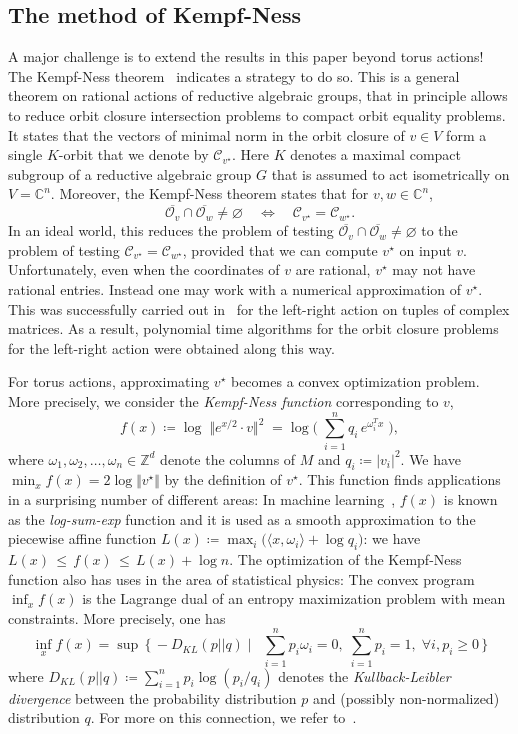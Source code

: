 \documentclass[10pt,a4paper]{article}
\theoremstyle{definition}
\newcommand{\CC}{\mathbb{C}}
\newcommand{\ZZ}{\mathbb{Z}}
\newcommand{\OO}{\ensuremath{\mathcal{O}}}
\newcommand{\KK}{\ensuremath{\mathcal{C}}}
\numberwithin{equation}{section}
\begin{document}
\subsection{The method of Kempf-Ness}
A major challenge is to extend the results in this paper beyond torus actions!
The Kempf-Ness theorem~\cite{kempfness} indicates a strategy to do so.
This is a general theorem on rational actions of reductive algebraic groups,
that in principle allows to reduce orbit closure intersection problems
to compact orbit equality problems.
It states that the vectors of minimal norm in the orbit closure of $v\in V$
form a single $K$-orbit that we denote by $\KK_{v^\star}$.
Here $K$ denotes a maximal compact subgroup of a reductive algebraic group $G$
that is assumed to act isometrically on $V=\CC^n$.
Moreover, the Kempf-Ness theorem states that for $v,w\in\CC^n$,
\[
 \overline{\OO_v}\cap\overline{\OO_w}\neq\varnothing \quad \iff\quad \KK_{v^\star}=\KK_{w^\star}.
\]
In an ideal world, this reduces the problem of testing
$\overline{\OO_v}\cap\overline{\OO_w}\neq\varnothing$
to the problem of testing $\KK_{v^\star}=\KK_{w^\star}$,
provided that we can compute $v^\star$ on input $v$.
Unfortunately, even when the coordinates of $v$ are rational,
$v^\star$ may not have rational entries.
Instead one may work with a numerical approximation of $v^\star$.
This was successfully carried out in~\cite{AZGLOW}
for the left-right action on tuples of complex matrices.
As a result, polynomial time algorithms for the orbit closure problems for the left-right action were obtained along this way.

For torus actions, approximating $v^\star$ becomes a convex optimization problem. More precisely, we consider the \emph{Kempf-Ness function} corresponding to $v$, \[
f(x) \coloneqq \log\; \Vert e^{x/2}\cdot v\Vert^2 \; = \log\Big(\;\sum_{i=1}^n q_i\, e^{\omega_i^T x}\;\Big),
\] where $\omega_1,\omega_2,\dots,\omega_n\in\ZZ^d$ denote the columns of $M$ and $q_i\coloneqq |v_i|^2$. We have $\min_x f(x)=2\log\Vert v^\star\Vert$ by the definition of $v^\star$. This function finds applications in a surprising number of different areas: In machine learning~\cite{ml-lse-1, ml-lse-2, ml-lse-3, ml-tropical},
$f(x)$ is known as the \textit{log-sum-exp} function and it is used as a smooth approximation
to the piecewise affine function $L(x)\coloneqq \max_i \big(\langle x,\omega_i\rangle +\log q_i\big)$: we have
$
 L(x) \,\leq\, f(x) \,\leq\, L(x) + \log n .
$
The optimization of the Kempf-Ness function also has uses in the area of statistical physics: The convex program $\inf_x f(x)$ is the Lagrange dual of an entropy maximization problem with mean constraints. More precisely, one has \[
\inf_x f(x) = \sup\, \Big\{\,  -D_{KL}(p||q)\; \Big| \; \ \; \sum_{i=1}^n p_i \omega_i =0,\; \sum_{i=1}^n p_i=1,\; \forall i, p_i\geq 0\, \Big\}
\] where $D_{KL}(p || q)\coloneqq \sum_{i=1}^n p_i \log(p_i/q_i)$ denotes the \emph{Kullback-Leibler divergence} between the probability distribution $p$ and (possibly non-normalized) distribution $q$. For more on this connection, we refer to~\cite{vishnoi-singh,vishnoi-straszak,leake-vishnoi,BLNW:20}.
\end{document}
